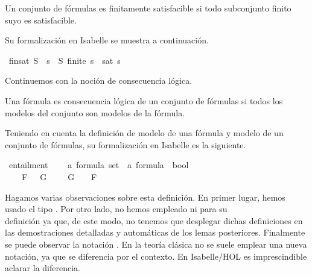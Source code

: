 \begin{isabellebody}
\begin{isamarkuptext}
  \begin{definicion}
    Un conjunto de fórmulas es finitamente satisfacible si todo
    subconjunto finito suyo es satisfacible.
  \end{definicion}

  Su formalización en Isabelle se muestra a continuación.%
\end{isamarkuptext}\isamarkuptrue%
\isamarkupfalse%
\ {\isachardoublequoteopen}fin{\isacharunderscore}sat\ S\ {\isasymequiv}\ {\isacharparenleft}{\isasymforall}s\ {\isasymsubseteq}\ S{\isachardot}\ finite\ s\ {\isasymlongrightarrow}\ sat\ s{\isacharparenright}{\isachardoublequoteclose}%
\begin{isamarkuptext}%
Continuemos con la noción de consecuencia lógica.

  \begin{definicion}
    Una fórmula es consecuencia lógica de un conjunto de fórmulas si
    todos los modelos del conjunto son modelos de la fórmula.
  \end{definicion}

  Teniendo en cuenta la definición de modelo de una fórmula y modelo de
  un conjunto de fórmulas, su formalización en Isabelle es la 
  siguiente.%
\end{isamarkuptext}\isamarkuptrue%
\isamarkupfalse%
\ entailment\ {\isacharcolon}{\isacharcolon}\ \isanewline
\ \ {\isachardoublequoteopen}{\isacharprime}a\ formula\ set\ {\isasymRightarrow}\ {\isacharprime}a\ formula\ {\isasymRightarrow}\ bool{\isachardoublequoteclose}\ {\isacharparenleft}{\isachardoublequoteopen}{\isacharparenleft}{\isacharunderscore}\ {\isasymTTurnstile}{\isacharslash}\ {\isacharunderscore}{\isacharparenright}{\isachardoublequoteclose}\ \isanewline
\ \ \ \ \ {\isacharbrackleft}{}{}{\isacharcomma}{}{}{\isacharbrackright}\ {}{}{\isacharparenright}\ \isanewline
\ \ {\isachardoublequoteopen}{\isasymGamma}\ {\isasymTTurnstile}\ F\ {\isasymequiv}\ {\isacharparenleft}{\isasymforall}{\isasymA}{\isachardot}\ {\isacharparenleft}{\isacharparenleft}{\isasymforall}G\ {\isasymin}\ {\isasymGamma}{\isachardot}\ {\isasymA}\ {\isasymTurnstile}\ G{\isacharparenright}\ {\isasymlongrightarrow}\ {\isacharparenleft}{\isasymA}\ {\isasymTurnstile}\ F{\isacharparenright}{\isacharparenright}{\isacharparenright}{\isachardoublequoteclose}%
\begin{isamarkuptext}%
Hagamos varias observaciones sobre esta definición. En primer
  lugar, hemos usado el tipo . Por otro lado, no hemos 
  empleado  ni  para su\\ definición ya que, de 
  este modo, no tenemos que desplegar dichas definiciones en las 
  demostraciones detalladas y automáticas de los lemas posteriores. 
  Finalmente se puede observar la notación \isa{{\isasymTTurnstile}}. En la teoría clásica no 
  se suele emplear una nueva notación, ya que se diferencia por el 
  contexto. En Isabelle/HOL es imprescindible aclarar la diferencia.


\end{isamarkuptext}
\end{isabellebody}
